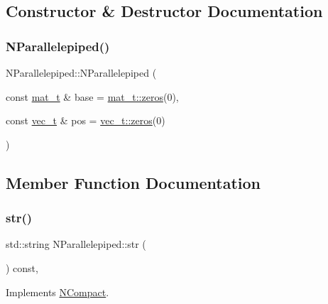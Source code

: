 \subsection{Constructor \& Destructor Documentation}
\mbox{\label{class_n_parallelepiped_af80601a4fc3edfeca3e7f1209cc2b704}} 
\subsubsection{\texorpdfstring{NParallelepiped()}{NParallelepiped()}}
{\footnotesize\ttfamily N\+Parallelepiped\+::\+N\+Parallelepiped (\begin{DoxyParamCaption}\item[{const \mbox{\hyperlink{group___n_algebra_ga44dfb60c1e03b44e98a332fb2ae71947}{mat\+\_\+t}} \&}]{base = {\ttfamily \mbox{\hyperlink{class_n_p_matrix_a701c8f60b4b8b727fccb063cd6f0784b}{mat\+\_\+t\+::zeros}}(0)},  }\item[{const \mbox{\hyperlink{group___n_algebra_ga0a2cfc67e738a3d73e4f12098c4c07f6}{vec\+\_\+t}} \&}]{pos = {\ttfamily \mbox{\hyperlink{class_n_vector_a6253cef3c39dd9d388bbf7d17069bc51}{vec\+\_\+t\+::zeros}}(0)} }\end{DoxyParamCaption})}



\subsection{Member Function Documentation}
\mbox{\label{class_n_parallelepiped_a2f5b58b9b80e9b3fda4177fb7703b221}} 
\subsubsection{\texorpdfstring{str()}{str()}}
{\footnotesize\ttfamily std\+::string N\+Parallelepiped\+::str (\begin{DoxyParamCaption}{ }\end{DoxyParamCaption}) const\hspace{0.3cm}{\ttfamily [override]}, {\ttfamily [virtual]}}



Implements \mbox{\hyperlink{class_n_compact_af1879d7342bf6d9902ed5473f6e89038}{N\+Compact}}.

